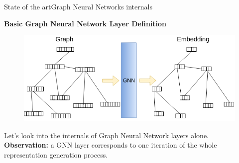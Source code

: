 \documentclass[xcolor=table]{beamer}
\begin{document}
\begin{frame}{State of the art}{Graph Neural Networks internals}

\textbf{Basic Graph Neural Network Layer Definition}
\begin{figure}
    \includegraphics[scale=0.35]{./img/GNN_internals_01.png}
\end{figure}
\vspace{20px}
Let's look into the internals of Graph Neural Network layers alone.
\textbf{Observation:} a GNN layer corresponds to one iteration of the whole representation generation process. 
\end{frame}
\end{document}
